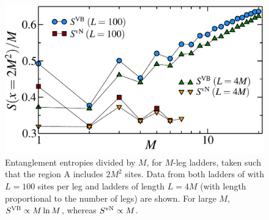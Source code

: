 \begin{figure} { \includegraphics[width=6in]{./figures/paper1/figure4/4fig.pdf}
 \caption[Area Law in 2D Heis model]{
Entanglement entropies divided by $M$,  for $M$-leg ladders, taken such that
the region A includes $2M^2$ sites.  
Data from both ladders of  with $L=100$ sites per leg and ladders of length $L=4M$ 
(with length proportional to the number of legs) are shown.
For large $M$, $S^{\rm VB}\propto M \ln M$,
whereas $S^{\rm vN}\propto M$.   
\label{zigzag}}} 
\end{figure}


